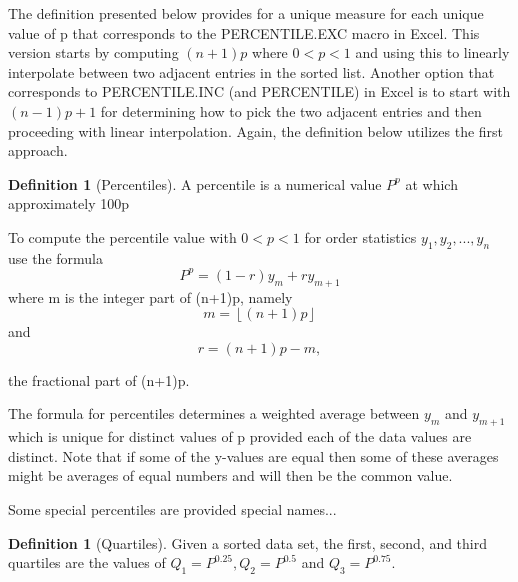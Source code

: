 \documentclass[10pt,]{book}
\theoremstyle{plain}
\theoremstyle{definition}
\newtheorem{definition}[theorem]{Definition}
\theoremstyle{definition}
\theoremstyle{definition}
\numberwithin{equation}{section}
\newcommand{\lt}{ < }
\begin{document}
The definition presented below provides for a unique measure for each unique value of p that corresponds to the PERCENTILE.EXC macro in Excel.  This version starts by computing \((n+1)p\) where 
\(0 < p < 1\) and using this to linearly interpolate between two adjacent entries in the sorted list.  Another option that corresponds to PERCENTILE.INC (and PERCENTILE) in Excel is to start with \((n-1)p+1\) for determining how to pick the two adjacent entries and then proceeding with linear interpolation. Again, the definition below utilizes the first approach.
\begin{definition}[{Percentiles}]\label{definition-3}
A percentile is a numerical value \(P^p\) at which approximately 100p%
\par
To compute the percentile value with \(0 \lt p \lt 1\) for order statistics \(y_1, y_2, ..., y_n\) use the formula 
		\begin{equation*}P^{p} = (1-r)y_m + ry_{m+1}\end{equation*}
	where m is the integer part of (n+1)p, namely 
		\begin{equation*}m = \left\lfloor (n+1)p \right\rfloor\end{equation*} 
	and 
		\begin{equation*}r = (n+1)p - m,\end{equation*}
	
	the fractional part of (n+1)p. 
\end{definition}
\par
The formula for percentiles determines a weighted average between \(y_m\) and \(y_{m+1}\) which is unique for distinct values of p provided each of the data values are distinct. Note that if some of the y-values are equal then some of these averages might be averages of equal numbers and will then be the common value.%
\par
Some special percentiles are provided special names...
%
\begin{definition}[{Quartiles}]\label{definition-4}
Given a sorted data set, the first, second, and third quartiles are the values of 
	\(Q_1 = P^{0.25}, Q_2 = P^{0.5}\) and \(Q_3 = P^{0.75}\).
\end{definition}
\par
\end{document}
